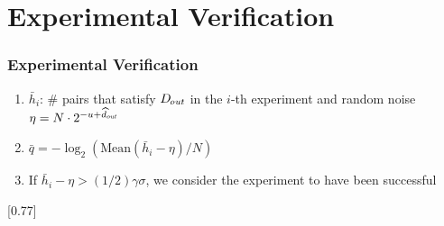 \documentclass{cubeamer}
\begin{document}
\section{Experimental Verification}
\begin{frame}
\frametitle{Experimental Verification}
\let\ofhundred\relax
{\footnotesize 
\begin{enumerate}
\item \( \bar{h}_i \): $\#$ pairs that satisfy $D_{\kern-.11em\mathit{out}}$ in the \( i \)-th experiment and random noise \( \eta = N \cdot 2^{-u + {\widehat d}_{\kern-.027em\mathit{out}}} \)
\item \( \bar{q} = - \log_2( \textrm{Mean}(\bar{h}_i-\eta) /N ) \)
\item If \( \bar{h}_i - \eta > (1/2)\gamma \sigma \), we consider the experiment to have been successful
\end{enumerate}
}
\begin{table}[!t]
    \centering%
    \begingroup
    \addtolength{\tabcolsep}{-0.15em}
    \scalebox{0.77}[0.77]{

}
\end{table}
\end{frame}
\end{document}
